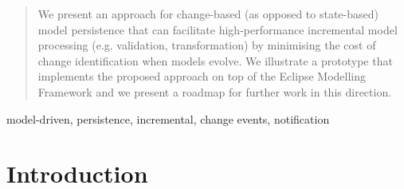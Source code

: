 \documentclass[conference]{IEEEtran}
\begin{document}
\maketitle

\begin{abstract}
\label{abstract}
We present an approach for change-based (as opposed to state-based) model persistence that can facilitate high-performance incremental model processing (e.g. validation, transformation) by minimising the cost of change identification when models evolve. We illustrate a prototype that implements the proposed approach on top of the Eclipse Modelling Framework and we present a roadmap for further work in this direction.
\end{abstract}

\begin{IEEEkeywords} 
model-driven, persistence, incremental, change events, notification
\end{IEEEkeywords}



%
\IEEEpeerreviewmaketitle

\section{Introduction}
\label{Introduction}
\end{document}
